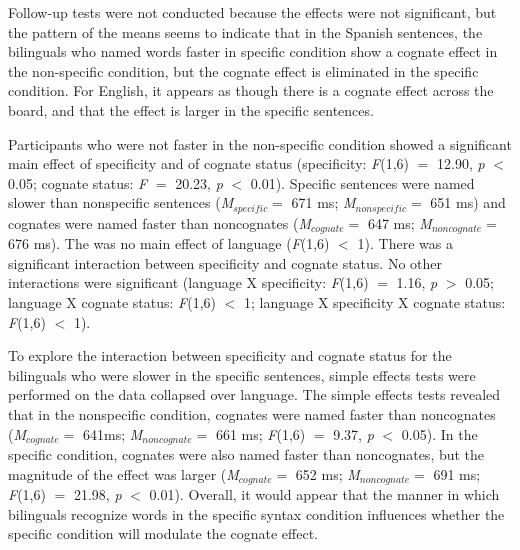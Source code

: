 




Follow-up tests were not conducted because the effects were not significant, but the pattern of the means seems to indicate that in the Spanish sentences, the bilinguals who named words faster in specific condition show a cognate effect in the non-specific condition, but the cognate effect is eliminated in the specific condition. For English, it appears as though there is a cognate effect across the board, and that the effect is larger in the specific sentences.  

Participants who were not faster in the non-specific condition showed a significant main effect of specificity and of cognate status (specificity: \textit{F}(1,6) $=$ 12.90, \textit{p} $<$ 0.05; cognate status: \textit{F} $=$ 20.23, \textit{p} $<$ 0.01). Specific sentences were named slower than nonspecific sentences (\textit{M}$_{specific} =$ 671 ms; \textit{M}$_{nonspecific} =$ 651 ms) and cognates were named faster than noncognates (\textit{M}$_{cognate} =$ 647 ms; \textit{M}$_{noncognate} =$ 676 ms). The was no main effect of language (\textit{F}(1,6) $<$ 1). There was a significant interaction between specificity and cognate status. No other interactions were significant (language X specificity: \textit{F}(1,6) $=$ 1.16, \textit{p} $>$ 0.05; language X cognate status: \textit{F}(1,6) $<$ 1; language X specificity X cognate status: \textit{F}(1,6) $<$ 1). 

To explore the interaction between specificity and cognate status for the bilinguals who were slower in the specific sentences, simple effects tests were performed on the data collapsed over language. The simple effects tests revealed that in the nonspecific condition, cognates were named faster than noncognates (\textit{M}$_{cognate} =$ 641ms; \textit{M}$_{noncognate} =$ 661 ms; \textit{F}(1,6) $=$ 9.37, \textit{p} $<$ 0.05). In the specific condition, cognates were also named faster than noncognates, but the magnitude of the  effect was larger (\textit{M}$_{cognate} =$ 652 ms; \textit{M}$_{noncognate} =$ 691 ms; \textit{F}(1,6) $=$ 21.98, \textit{p} $<$ 0.01). Overall, it would appear that the manner in which bilinguals recognize words in the specific syntax condition influences whether the specific condition will modulate the cognate effect.


